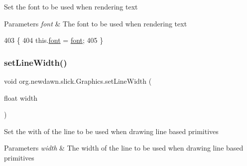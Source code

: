Set the font to be used when rendering text


\begin{DoxyParams}{Parameters}
{\em font} & The font to be used when rendering text \\
\hline
\end{DoxyParams}

\begin{DoxyCode}
403                                    \{
404         this.\mbox{\hyperlink{classorg_1_1newdawn_1_1slick_1_1_graphics_a3fc899a622817cc89e2c9f0111243b65}{font}} = \mbox{\hyperlink{classorg_1_1newdawn_1_1slick_1_1_graphics_a3fc899a622817cc89e2c9f0111243b65}{font}};
405     \}
\end{DoxyCode}
\mbox{\label{classorg_1_1newdawn_1_1slick_1_1_graphics_af12d5c2e195b3c952e28b0c54e880ae8}} 
\subsubsection{\texorpdfstring{set\+Line\+Width()}{setLineWidth()}}
{\footnotesize\ttfamily void org.\+newdawn.\+slick.\+Graphics.\+set\+Line\+Width (\begin{DoxyParamCaption}\item[{float}]{width }\end{DoxyParamCaption})\hspace{0.3cm}{\ttfamily [inline]}}

Set the with of the line to be used when drawing line based primitives


\begin{DoxyParams}{Parameters}
{\em width} & The width of the line to be used when drawing line based primitives \\
\hline
\end{DoxyParams}

